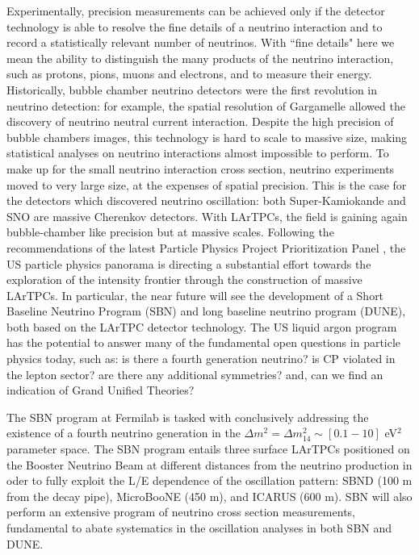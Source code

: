 Experimentally, precision measurements can be achieved only if the detector technology is able to resolve the fine details of a neutrino interaction and to record a statistically relevant number of neutrinos.  With ``fine details" here we mean the ability to distinguish the many products of the neutrino interaction, such as protons, pions, muons and electrons, and to measure their energy.
Historically,  bubble chamber neutrino detectors were the first revolution in neutrino detection: for example, the spatial resolution of Gargamelle allowed the discovery of neutrino neutral current interaction. Despite the high precision of bubble chambers images, this technology is hard to scale to massive size, making statistical analyses on neutrino interactions almost impossible to perform. To make up for the small neutrino interaction cross section, neutrino experiments moved to very large size, at the expenses of spatial precision. This is the case for the detectors which discovered neutrino oscillation:  both Super-Kamiokande and SNO are massive Cherenkov detectors. With LArTPCs, the field is gaining again bubble-chamber like precision but at massive scales. Following the recommendations of  the latest Particle Physics Project Prioritization Panel  \cite{P5}, the US particle physics panorama is directing a substantial effort towards the exploration of the intensity frontier through the construction of massive LArTPCs. In particular, the near future will see the development of a Short Baseline Neutrino Program (SBN) and long baseline neutrino program  (DUNE), both based on the LArTPC detector technology. The US liquid argon program has the potential to answer many of the fundamental open questions in particle physics today, such as: is there a fourth generation neutrino? is CP violated in the lepton sector? are there any additional symmetries? and, can we find an indication of Grand Unified Theories? 

The SBN program at Fermilab is tasked with conclusively addressing the existence of a fourth neutrino generation in the  $\Delta m^2= \Delta m^2_{14} \sim [0.1 - 10]$ eV$^2$ parameter space. The SBN program entails three surface LArTPCs positioned on the Booster Neutrino Beam at different distances from the neutrino production in oder to fully exploit  the L/E dependence of the oscillation pattern:  SBND (100 m from the decay pipe), MicroBooNE (450 m), and ICARUS (600 m). SBN will also perform an extensive 
program of neutrino cross section measurements, fundamental to abate systematics in the oscillation analyses in both SBN and DUNE.

